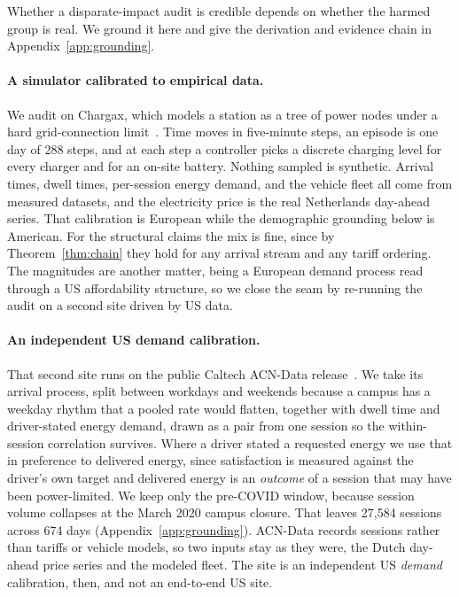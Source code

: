 \documentclass[manuscript, screen, review, anonymous]{acmart}
\begin{document}
Whether a disparate-impact audit is credible depends on whether the harmed group is real. We ground it here and give the derivation and evidence chain in Appendix~\ref{app:grounding}.

\paragraph{A simulator calibrated to empirical data.}
We audit on Chargax, which models a station as a tree of power nodes under a hard grid-connection limit~\cite{ponse2025chargax}. Time moves in five-minute steps, an episode is one day of 288 steps, and at each step a controller picks a discrete charging level for every charger and for an on-site battery. Nothing sampled is synthetic. Arrival times, dwell times, per-session energy demand, and the vehicle fleet all come from measured datasets, and the electricity price is the real Netherlands day-ahead series. That calibration is European while the demographic grounding below is American. For the structural claims the mix is fine, since by Theorem~\ref{thm:chain} they hold for any arrival stream and any tariff ordering. The magnitudes are another matter, being a European demand process read through a US affordability structure, so we close the seam by re-running the audit on a second site driven by US data.

\paragraph{An independent US demand calibration.}
\label{sec:acn}
That second site runs on the public Caltech ACN-Data release~\cite{lee2019acn}. We take its arrival process, split between workdays and weekends because a campus has a weekday rhythm that a pooled rate would flatten, together with dwell time and driver-stated energy demand, drawn as a pair from one session so the within-session correlation survives. Where a driver stated a requested energy we use that in preference to delivered energy, since satisfaction is measured against the driver's own target and delivered energy is an \emph{outcome} of a session that may have been power-limited. We keep only the pre-COVID window, because session volume collapses at the March 2020 campus closure. That leaves 27{,}584 sessions across 674 days (Appendix~\ref{app:grounding}). ACN-Data records sessions rather than tariffs or vehicle models, so two inputs stay as they were, the Dutch day-ahead price series and the modeled fleet. The site is an independent US \emph{demand} calibration, then, and not an end-to-end US site.
\end{document}
